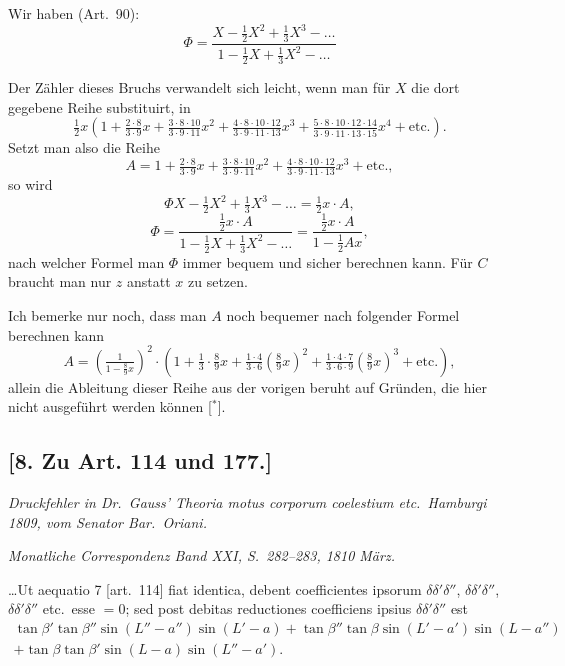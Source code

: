 \documentclass[12pt,a4paper]{article}
\begin{document}
Wir haben (Art.~90):
\[
\Phi = \frac{X - \tfrac{1}{2}X^2 + \tfrac{1}{3}X^3 - \ldots}{1 - \tfrac{1}{2}X + \tfrac{1}{3}X^2 - \ldots}
\]

\newpage

Der Z\"ahler dieses Bruchs verwandelt sich leicht, wenn man f\"ur $X$ die
dort gegebene Reihe substituirt, in
\[
\tfrac{1}{2}x\left(1 + \tfrac{2 \cdot 8}{3 \cdot 9}x + \tfrac{3 \cdot 8 \cdot 10}{3 \cdot 9 \cdot 11}x^2 + \tfrac{4 \cdot 8 \cdot 10 \cdot 12}{3 \cdot 9 \cdot 11 \cdot 13}x^3 + \tfrac{5 \cdot 8 \cdot 10 \cdot 12 \cdot 14}{3 \cdot 9 \cdot 11 \cdot 13 \cdot 15}x^4 + \text{etc.}\right).
\]
Setzt man also die Reihe
\[
A = 1 + \tfrac{2 \cdot 8}{3 \cdot 9}x + \tfrac{3 \cdot 8 \cdot 10}{3 \cdot 9 \cdot 11}x^2 + \tfrac{4 \cdot 8 \cdot 10 \cdot 12}{3 \cdot 9 \cdot 11 \cdot 13}x^3 + \text{etc.},
\]
so wird
\[
\Phi X - \tfrac{1}{2}X^2 + \tfrac{1}{3}X^3 - \ldots = \tfrac{1}{2}x \cdot A,
\]
\[
\Phi = \frac{\tfrac{1}{2}x \cdot A}{1 - \tfrac{1}{2}X + \tfrac{1}{3}X^2 - \ldots} = \frac{\tfrac{1}{2}x \cdot A}{1 - \tfrac{1}{2}A x},
\]
nach welcher Formel man $\Phi$ immer bequem und sicher berechnen kann. F\"ur
$C$ braucht man nur $z$ anstatt $x$ zu setzen.

Ich bemerke nur noch, dass man $A$ noch bequemer nach folgender Formel
berechnen kann
\[
A = \left(\tfrac{1}{1 - \tfrac{8}{9}x}\right)^2 \cdot \left(1 + \tfrac{1}{3}\cdot\tfrac{8}{9}x + \tfrac{1 \cdot 4}{3 \cdot 6}\left(\tfrac{8}{9}x\right)^2 + \tfrac{1 \cdot 4 \cdot 7}{3 \cdot 6 \cdot 9}\left(\tfrac{8}{9}x\right)^3 + \text{etc.}\right),
\]
allein die Ableitung dieser Reihe aus der vorigen beruht auf Gr\"unden, die hier
nicht ausgef\"uhrt werden k\"onnen [$^*$].

\begin{flushright}
\end{flushright}

\subsection*{[8. Zu Art. 114 und 177.]}

\textit{Druckfehler in Dr.~Gauss' Theoria motus corporum coelestium etc.\ Hamburgi 1809, vom Senator Bar.~Oriani.}

\textit{Monatliche Correspondenz Band XXI, S.~282--283, 1810 M\"arz.}

\ldots Ut aequatio 7 [art.~114] fiat identica, debent coefficientes ipsorum
$\delta\delta'\delta''$, $\delta\delta'\delta''$, $\delta\delta'\delta''$ etc.~esse $= 0$; sed post debitas reductiones coefficiens
ipsius $\delta\delta'\delta''$ est
\begin{multline*}
\tan\beta' \tan\beta'' \sin(L'' - a'') \sin(L' - a) + \tan\beta'' \tan\beta \sin(L' - a') \sin(L - a'') \\
+ \tan\beta \tan\beta' \sin(L - a) \sin(L'' - a').
\end{multline*}
\end{document}
